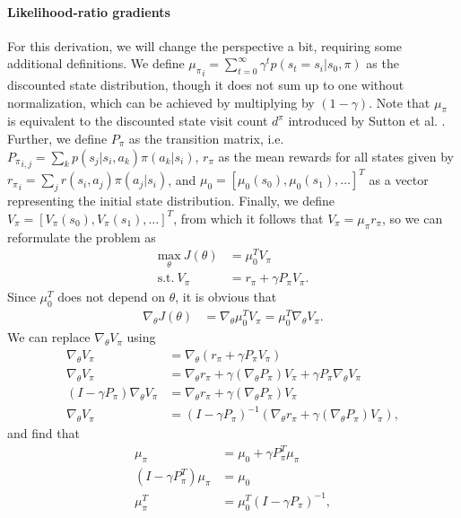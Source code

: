 \documentclass[final]{IEEEtran}
\begin{document}
\paragraph{Likelihood-ratio gradients} 
For this derivation, we will change the perspective a bit, requiring some additional definitions. 
We define ${\mu_\pi}_i = \sum_{t=0}^{\infty} \gamma^t p(s_t=s_i | s_0, \pi)$ as the discounted state distribution, though it does not sum up to one without normalization, which can be achieved by multiplying by $(1-\gamma)$. 
Note that $\mu_\pi$ is equivalent to the discounted state visit count $d^\pi$ introduced by Sutton et al. \cite{Sutton:1999:PGM:3009657.3009806}.
Further, we define $P_\pi$ as the transition matrix, i.e. ${P_\pi}_{i,j}=\sum\nolimits_k p(s_j|s_i,a_k)\pi(a_k|s_i)$, $r_\pi$ as the mean rewards for all states given by ${r_\pi}_i = \sum_j r(s_i,a_j)\pi(a_j|s_i)$, and $\mu_0 = \left[\mu_0(s_0),\mu_0(s_1),\ldots\right]^T$ as a vector representing the initial state distribution.
Finally, we define $V_\pi = \left[ V_\pi(s_0), V_\pi(s_1), \ldots \right]^T$, from which it follows that $V_\pi = \mu_\pi r_\pi$, so we can reformulate the problem as 
\begin{align}
	\underset{\theta}{\text{max}}\ J(\theta) &= \mu_0^T V_\pi \\
	\text{s.t.}\ V_\pi &= r_\pi + \gamma P_\pi V_\pi . \nonumber
\end{align}
Since $\mu_0^T$ does not depend on $\theta$, it is obvious that 
\begin{align*}
	\nabla_\theta J(\theta) &= \nabla_\theta \mu_0^T V_\pi = \mu_0^T \nabla_\theta V_\pi.
\end{align*}
We can replace $\nabla_\theta V_\pi$ using
\begin{align*}
	\nabla_\theta V_\pi &= \nabla_\theta \left( r_\pi + \gamma P_\pi V_\pi \right)
	\\ \nabla_\theta V_\pi &= \nabla_\theta r_\pi + \gamma (\nabla_\theta P_\pi) V_\pi + \gamma P_\pi \nabla_\theta V_\pi
	\\ (I-\gamma P_\pi) \nabla_\theta V_\pi &= \nabla_\theta r_\pi + \gamma (\nabla_\theta P_\pi) V_\pi
	\\ \nabla_\theta V_\pi &= (I - \gamma P_\pi)^{-1} (\nabla_\theta r_\pi + \gamma (\nabla_\theta P_\pi) V_\pi), 
\end{align*}
and find that
\begin{align*}
	\mu_\pi &= \mu_0 + \gamma P_\pi^T \mu_\pi \nonumber \\
	(I- \gamma P_\pi^T)\mu_\pi &= \mu_0 \nonumber \\
	\mu_\pi^T &= \mu_0^T (I- \gamma P_\pi)^{-1} ,
\end{align*}
\end{document}
